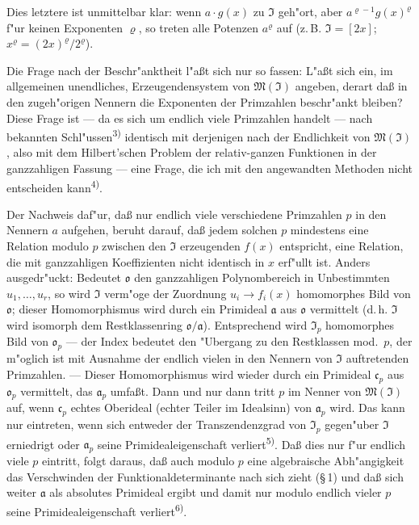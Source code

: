 Dies letztere ist unmittelbar klar: wenn $a\cdot g(x)$ zu $\mathfrak{I}$ geh"ort, aber $a^{\varrho-1}g(x)^{\varrho}$ f"ur keinen Exponenten $\varrho$, so treten alle Potenzen $a^{\varrho}$ auf (z.\,B. $\mathfrak{I}=[2x]$; $x^{\varrho}=(2x)^{\varrho}/2^{\varrho}$).

Die Frage nach der Beschr"anktheit l"a\ss t sich nur so fassen: L"a\ss t sich ein, im allgemeinen unendliches, Erzeugendensystem von $\mathfrak{M}(\mathfrak{I})$ angeben, derart da\ss{} in den zugeh"origen Nennern die Exponenten der Primzahlen beschr"ankt bleiben? Diese Frage ist --- da es sich um endlich viele Primzahlen handelt --- nach bekannten Schl"ussen\textsuperscript{3)} identisch mit derjenigen nach der Endlichkeit von $\mathfrak{M}(\mathfrak{I})$, also mit dem Hilbert'schen Problem der relativ-ganzen Funktionen in der ganzzahligen Fassung --- eine Frage, die ich mit den angewandten Methoden nicht entscheiden kann\textsuperscript{4)}.

Der Nachweis daf"ur, da\ss{} nur endlich viele verschiedene Primzahlen $p$ in den Nennern $a$ aufgehen, beruht darauf, da\ss{} jedem solchen $p$ mindestens eine Relation modulo $p$ zwischen den $\mathfrak{I}$ erzeugenden $f(x)$ entspricht, eine Relation, die mit ganzzahligen Koeffizienten nicht identisch in $x$ erf"ullt ist. Anders ausgedr"uckt: Bedeutet $\mathfrak{o}$ den ganzzahligen Polynombereich in Unbestimmten $u_1,\ldots,u_r$, so wird $\mathfrak{I}$ verm"oge der Zuordnung $u_i \to f_i(x)$ homomorphes Bild von $\mathfrak{o}$; dieser Homomorphismus wird durch ein Primideal $\mathfrak{a}$ aus $\mathfrak{o}$ vermittelt (d.\,h. $\mathfrak{I}$ wird isomorph dem Restklassenring $\mathfrak{o}/\mathfrak{a}$). Entsprechend wird $\mathfrak{I}_p$ homomorphes Bild von $\mathfrak{o}_p$ --- der Index bedeutet den "Ubergang zu den Restklassen mod.\ $p$, der m"oglich ist mit Ausnahme der endlich vielen in den Nennern von $\mathfrak{I}$ auftretenden Primzahlen. --- Dieser Homomorphismus wird wieder durch ein Primideal $\mathfrak{c}_p$ aus $\mathfrak{o}_p$ vermittelt, das $\mathfrak{a}_p$ umfa\ss t. Dann und nur dann tritt $p$ im Nenner von $\mathfrak{M}(\mathfrak{I})$ auf, wenn $\mathfrak{c}_p$ echtes Oberideal (echter Teiler im Idealsinn) von $\mathfrak{a}_p$ wird. Das kann nur eintreten, wenn sich entweder der Transzendenzgrad von $\mathfrak{I}_p$ gegen"uber $\mathfrak{I}$ erniedrigt oder $\mathfrak{a}_p$ seine Primidealeigenschaft verliert\textsuperscript{5)}. Da\ss{} dies nur f"ur endlich viele $p$ eintritt, folgt daraus, da\ss{} auch modulo $p$ eine algebraische Abh"angigkeit das Verschwinden der Funktionaldeterminante nach sich zieht (\S\,1) und da\ss{} sich weiter $\mathfrak{a}$ als absolutes Primideal ergibt und damit nur modulo endlich vieler $p$ seine Primidealeigenschaft verliert\textsuperscript{6)}.


